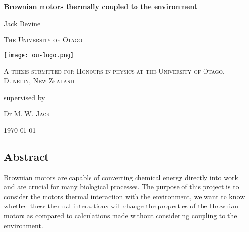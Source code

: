 \documentclass[11pt]{report} %
\begin{document}
	\begin{titlepage}
		\centering
		{\huge\bfseries Brownian motors thermally coupled to the environment\par}
		\vspace{1cm}
		{\huge Jack Devine\par}
		\vspace{1cm}
		{\scshape\LARGE The University of Otago \par}
		\vspace{1cm}
		\texttt{[image: ou-logo.png]}\par\vspace{1cm}
		\vspace{1cm}
		{\scshape\Large A thesis submitted for Honours in physics at the University of Otago, Dunedin, New Zealand\par}
		\vspace{1.5cm}
		\vspace{2cm}
		\vfill
		supervised by\par
		Dr M. W. \textsc{Jack}

		\vfill

		{\large \today\par}
	\end{titlepage}


\newpage

%
\begin{center}
\section*{Abstract} %
\end{center}

Brownian motors are capable of converting chemical energy directly into work and are crucial for many biological processes. The purpose of this project is to consider the motors thermal interaction with  the environment, we want to know whether these thermal interactions will change the properties of the Brownian motors as compared to calculations made without considering coupling to the environment.
\end{document}
